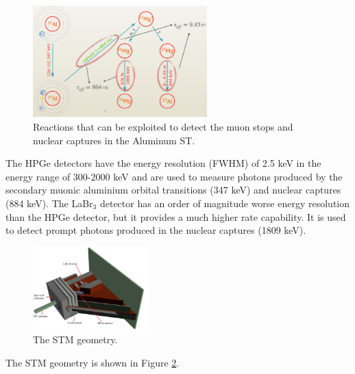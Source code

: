 \begin{figure}[!h]
    \centering
    \includegraphics[width =0.6\textwidth]{figures/png/Screenshot_20240706_094517.png}
    \caption[The muon stops 
    and nuclear captures detection in Al ST.]{Reactions that can be exploited to detect the muon stops 
    and nuclear captures in the Aluminum ST.}
    \label{fig:stmprocess}
    \end{figure}

The HPGe detectors have the 
    energy resolution (FWHM) of 2.5 keV in the energy range of 300-2000 keV and are used 
    to measure photons produced by the secondary muonic aluminium orbital transitions 
    (347 keV) and nuclear captures (884 keV). The LaBr$_3$ detector has an order of 
    magnitude worse energy resolution than the HPGe detector, but it provides a much 
    higher rate capability. It is used to detect prompt photons produced
    in the nuclear captures (1809 keV).  
    \begin{figure}[!h]
        \centering
        \includegraphics[width =0.4\textwidth]{figures/png/Setup.png}
        \caption[The Stopping Target Monitor geometry.]{The STM geometry.}
        \label{fig:stmfigure}
        \end{figure}
The STM geometry is shown in Figure \ref{fig:stmfigure}.

